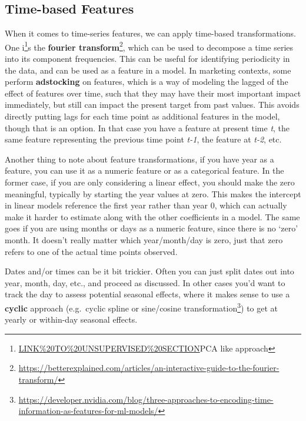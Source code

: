 \documentclass[
  letterpaper,
]{krantz}
\DeclareRobustCommand{\href}[2]{#2\footnote{\url{#1}}}
\begin{document}
\subsection{Time-based Features}\label{time-based-features}

When it comes to time-series features, we can apply time-based
transformations. One \href{LINK%20TO%20UNSUPERVISED%20SECTION}{PCA like
approach} is the
\href{https://betterexplained.com/articles/an-interactive-guide-to-the-fourier-transform/}{\textbf{fourier
transform}}, which can be used to decompose a time series into its
component frequencies. This can be useful for identifying periodicity in
the data, and can be used as a feature in a model. In marketing
contexts, some perform \textbf{adstocking} on features, which is a way
of modeling the lagged of the effect of features over time, such that
they may have their most important impact immediately, but still can
impact the present target from past values. This avoids directly putting
lags for each time point as additional features in the model, though
that is an option. In that case you have a feature at present time
\emph{t}, the same feature representing the previous time point
\emph{t-1}, the feature at \emph{t-2}, etc.

Another thing to note about feature transformations, if you have year as
a feature, you can use it as a numeric feature or as a categorical
feature. In the former case, if you are only considering a linear
effect, you should make the zero meaningful, typically by starting the
year values at zero. This makes the intercept in linear models reference
the first year rather than year 0, which can actually make it harder to
estimate along with the other coefficients in a model. The same goes if
you are using months or days as a numeric feature, since there is no
`zero' month. It doesn't really matter which year/month/day is zero,
just that zero refers to one of the actual time points observed.

Dates and/or times can be it bit trickier. Often you can just split
dates out into year, month, day, etc., and proceed as discussed. In
other cases you'd want to track the day to assess potential seasonal
effects, where it makes sense to use a \textbf{cyclic} approach
(e.g.~\href{https://developer.nvidia.com/blog/three-approaches-to-encoding-time-information-as-features-for-ml-models/}{cyclic
spline or sine/cosine transformation}) to get at yearly or within-day
seasonal effects.
\end{document}
